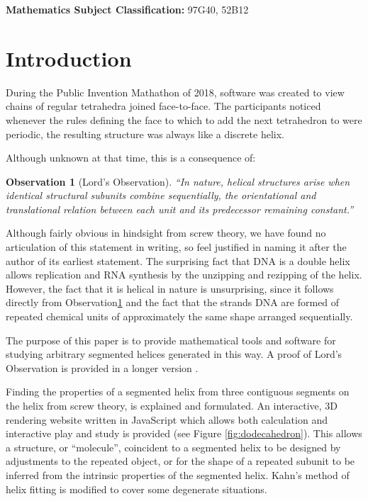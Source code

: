 \documentclass{svproc}
\newtheorem{observation}{Observation}
\begin{document}


\makeatletter
\newcommand{\subjclass}[1]{%
    \small
    \textbf{Mathematics Subject Classification:} #1}


\makeatother

\subjclass{ 97G40, 52B12}

\section{Introduction}

During the Public Invention Mathathon of 2018\cite{read2019mathathon}, software was
created to view chains of regular tetrahedra joined face-to-face.
The participants noticed whenever the rules
defining the face to which to add the next
tetrahedron
to were periodic, the resulting
structure was always like a discrete helix.

Although unknown at that time, this is a consequence of:
\begin{observation}[Lord's Observation]
  “In nature, helical structures arise when identical structural subunits combine sequentially, the orientational and translational relation between each unit and its predecessor remaining constant.”\cite{lord2002helical}
  \label{obs:lords}
\end{observation}
Although fairly obvious in hindsight from screw theory, we have found no articulation of this statement
in writing, so feel justified in naming it after the author of its earliest statement.
The surprising fact that DNA is a double helix allows replication and RNA synthesis by the unzipping and rezipping
of the helix.
However, the fact that it is helical in nature is unsurprising, since it follows directly from Observation\ref{obs:lords} and the
fact that the strands DNA are formed of repeated chemical units of approximately the same shape arranged sequentially.

The purpose of this paper is to provide mathematical
tools and software for studying arbitrary
segmented helices generated in this way. A proof of Lord's Observation is provided in a longer version \cite{readfullsegmentedhelix}.

Finding the properties of a segmented helix from three contiguous segments on the helix from screw theory\cite{wittenburg2016kinematics,kahn1989defining},
is explained and formulated.
An interactive, 3D rendering website written in JavaScript which allows both calculation and
interactive play and study is provided\cite{segmentedhelixinteractive}
(see Figure \ref{fig:dodecahedron}). This allows
a structure, or ``molecule'', coincident to a segmented helix to be designed
by adjustments to the repeated object, or for the shape of
a repeated subunit to be inferred from the intrinsic properties of the
segmented helix.
Kahn's method of helix fitting\cite{kahn1989defining,enkhbayar2008helfit,lee2007qhelix} is modified to cover some degenerate situations.
\end{document}
